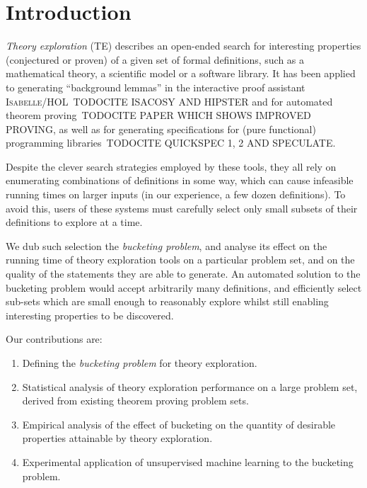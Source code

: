\section{Introduction}

\emph{Theory exploration} (TE) describes an open-ended search for
interesting properties (conjectured or proven) of a given set of formal
definitions, such as a mathematical theory, a scientific model or a software
library. It has been applied to generating ``background lemmas'' in the
interactive proof assistant \textsc{Isabelle/HOL}~TODO{CITE ISACOSY AND HIPSTER}
and for automated theorem proving~TODO{CITE PAPER WHICH SHOWS IMPROVED PROVING},
as well as for generating specifications for (pure functional) programming
libraries~TODO{CITE QUICKSPEC 1, 2 AND SPECULATE}.

Despite the clever search strategies employed by these tools, they all rely on
enumerating combinations of definitions in some way, which can cause infeasible
running times on larger inputs (in our experience, a few dozen definitions). To
avoid this, users of these systems must carefully select only small subsets of
their definitions to explore at a time.

We dub such selection the \emph{bucketing problem}, and analyse its effect on
the running time of theory exploration tools on a particular problem set, and on
the quality of the statements they are able to generate. An automated solution
to the bucketing problem would accept arbitrarily many definitions, and
efficiently select sub-sets which are small enough to reasonably explore whilst
still enabling interesting properties to be discovered.

Our contributions are:

\begin{enumerate}
  \item Defining the \emph{bucketing problem} for theory exploration.
  \item Statistical analysis of theory exploration performance on a large
    problem set, derived from existing theorem proving problem sets.
  \item Empirical analysis of the effect of bucketing on the quantity of
    desirable properties attainable by theory exploration.
  \item Experimental application of unsupervised machine learning to the
    bucketing problem.
\end{enumerate}

